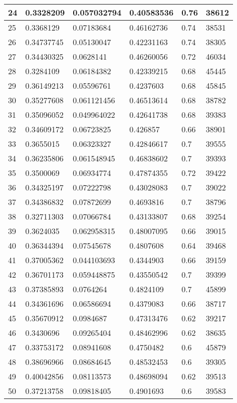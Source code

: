 \begin{longtable}{|l|l|l|l|l|l|}
24 & 0.3328209 & 0.057032794 & 0.40583536 & 0.76 & 38612 \\ \hline 
25 & 0.3368129 & 0.07183684 & 0.46162736 & 0.74 & 38531 \\ \hline 
26 & 0.34737745 & 0.05130047 & 0.42231163 & 0.74 & 38305 \\ \hline 
27 & 0.34430325 & 0.0628141 & 0.46260056 & 0.72 & 46034 \\ \hline 
28 & 0.3284109 & 0.06184382 & 0.42339215 & 0.68 & 45445 \\ \hline 
29 & 0.36149213 & 0.05596761 & 0.4237603 & 0.68 & 45845 \\ \hline 
30 & 0.35277608 & 0.061121456 & 0.46513614 & 0.68 & 38782 \\ \hline 
31 & 0.35096052 & 0.049964022 & 0.42641738 & 0.68 & 39383 \\ \hline 
32 & 0.34609172 & 0.06723825 & 0.426857 & 0.66 & 38901 \\ \hline 
33 & 0.3655015 & 0.06323327 & 0.42846617 & 0.7 & 39555 \\ \hline 
34 & 0.36235806 & 0.061548945 & 0.46838602 & 0.7 & 39393 \\ \hline 
35 & 0.3500069 & 0.06934774 & 0.47874355 & 0.72 & 39422 \\ \hline 
36 & 0.34325197 & 0.07222798 & 0.43028083 & 0.7 & 39022 \\ \hline 
37 & 0.34386832 & 0.07872699 & 0.4693816 & 0.7 & 38796 \\ \hline 
38 & 0.32711303 & 0.07066784 & 0.43133807 & 0.68 & 39254 \\ \hline 
39 & 0.3624035 & 0.062958315 & 0.48007095 & 0.66 & 39015 \\ \hline 
40 & 0.36344394 & 0.07545678 & 0.4807608 & 0.64 & 39468 \\ \hline 
41 & 0.37005362 & 0.044103693 & 0.4344903 & 0.66 & 39159 \\ \hline 
42 & 0.36701173 & 0.059448875 & 0.43550542 & 0.7 & 39399 \\ \hline 
43 & 0.37385893 & 0.0764264 & 0.4824109 & 0.7 & 45899 \\ \hline 
44 & 0.34361696 & 0.06586694 & 0.4379083 & 0.66 & 38717 \\ \hline 
45 & 0.35670912 & 0.0984687 & 0.47313476 & 0.62 & 39217 \\ \hline 
46 & 0.3430696 & 0.09265404 & 0.48462996 & 0.62 & 38635 \\ \hline 
47 & 0.33753172 & 0.08941608 & 0.4750482 & 0.6 & 45879 \\ \hline 
48 & 0.38696966 & 0.08684645 & 0.48532453 & 0.6 & 39305 \\ \hline 
49 & 0.40042856 & 0.08113573 & 0.48698094 & 0.62 & 39513 \\ \hline 
50 & 0.37213758 & 0.09818405 & 0.4901693 & 0.6 & 39583 \\ \hline 
\end{longtable}